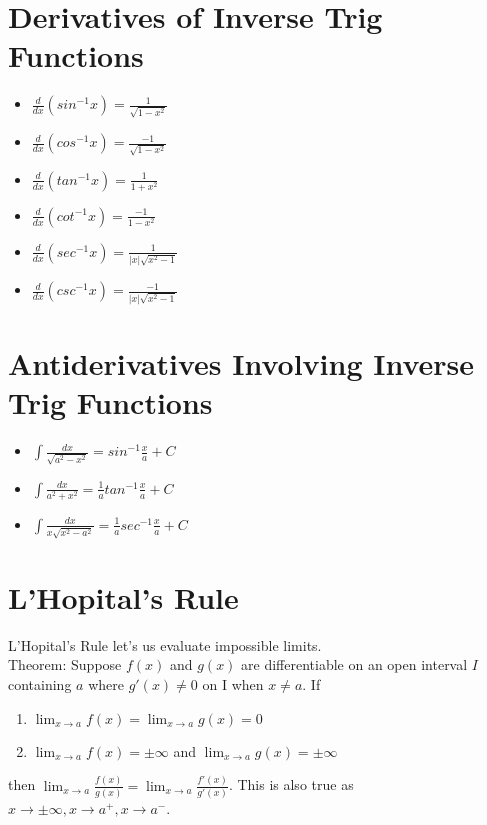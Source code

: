 \documentclass{article}
\begin{document}
\section{Derivatives of Inverse Trig Functions}
\begin{itemize}
  \item {
  $\frac{d}{dx}(sin^{-1}x) = \frac{1}{\sqrt{1-x^2}}$
  }
  \item {
  $\frac{d}{dx}(cos^{-1}x) = \frac{-1}{\sqrt{1-x^2}}$
  }
  \item {
  $\frac{d}{dx}(tan^{-1}x) = \frac{1}{1+x^2}$
  }
  \item {
  $\frac{d}{dx}(cot^{-1}x) = \frac{-1}{1-x^2}$
  }
  \item {
  $\frac{d}{dx}(sec^{-1}x) = \frac{1}{|x|\sqrt{x^2-1}}$
  }
  \item {
  $\frac{d}{dx}(csc^{-1}x) = \frac{-1}{|x|\sqrt{x^2-1}}$
  }
\end{itemize}

\section{Antiderivatives Involving Inverse Trig Functions}
\begin{itemize}
  \item {
  $\int\frac{dx}{\sqrt{a^2 - x^2}} = sin^{-1}\frac{x}{a}+C$
  }
  \item {
  $\int\frac{dx}{a^2 + x^2} = \frac{1}{a}tan^{-1}\frac{x}{a}+C$
  }
  \item {
  $\int\frac{dx}{x\sqrt{x^2 - a^2}} = \frac{1}{a}sec^{-1}\frac{x}{a}+C$
  }
\end{itemize}

\section{L'Hopital's Rule}
L'Hopital's Rule let's us evaluate impossible limits.\\

Theorem: Suppose $f(x)$ and $g(x)$ are differentiable on an open interval $I$ containing $a$ where $g'(x) \neq 0$ on I when $x \neq a$. If
\begin{enumerate}
  \item $\lim_{x \to a}f(x) = \lim_{x \to a}g(x) = 0$
  \item $\lim_{x \to a}f(x) = \pm\infty$ and $\lim_{x \to a}g(x) = \pm\infty$
\end{enumerate}
then $\lim_{x \to a}\frac{f(x)}{g(x)} = \lim_{x \to a}\frac{f'(x)}{g'(x)}$. This is also true as $x \to \pm\infty, x \to a^+, x \to a^-$.
\end{document}
